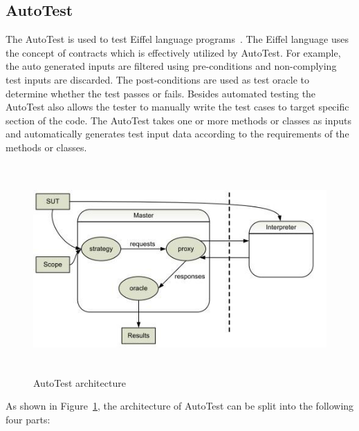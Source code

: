 \subsection{AutoTest} \label{autotest_2}
The AutoTest is used to test Eiffel language programs~\cite{ciupa2007automatic}. The Eiffel language uses the concept of contracts which is effectively utilized by AutoTest. For example, the auto generated inputs are filtered using pre-conditions and non-complying test inputs are discarded. The post-conditions are used as test oracle to determine whether the test passes or fails. Besides automated testing the AutoTest also allows the tester to manually write the test cases to target specific section of the code. The AutoTest takes one or more methods or classes as inputs and automatically generates test input data according to the requirements of the methods or classes.
\bigskip
\bigskip
\begin{figure}[h]
	\centering
	\includegraphics[width=14cm, height=8cm]{chapter2/autotest.png}
	\bigskip
	\caption{AutoTest architecture~\cite{leitner2007reconciling}}
	\label{fig:autotest}
\end{figure}
\bigskip
\noindent As shown in Figure~\ref{fig:autotest}, the architecture of AutoTest can be split into the following four parts:

